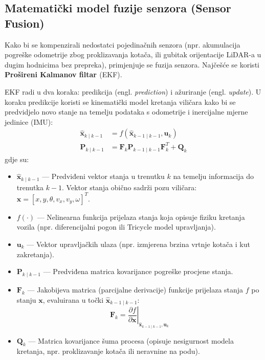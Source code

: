 \subsection{Matematički model fuzije senzora (Sensor Fusion)}
Kako bi se kompenzirali nedostatci pojedinačnih senzora (npr. akumulacija pogreške odometrije zbog proklizavanja kotača, ili gubitak orijentacije LiDAR-a u dugim hodnicima bez prepreka), primjenjuje se fuzija senzora. Najčešće se koristi \textbf{Prošireni Kalmanov filtar \cite{sensorfusion}} (EKF).

EKF radi u dva koraka: predikcija (engl. \textit{prediction}) i ažuriranje (engl. \textit{update}). U koraku predikcije koristi se kinematički model kretanja viličara kako bi se predvidjelo novo stanje na temelju podataka s odometrije i inercijalne mjerne jedinice (IMU):
\begin{align}
    \mathbf{\hat{x}}_{k \mid k-1} &= f(\mathbf{\hat{x}}_{k-1 \mid k-1}, \mathbf{u}_k) \\
    \mathbf{P}_{k \mid k-1} &= \mathbf{F}_k \mathbf{P}_{k-1 \mid k-1} \mathbf{F}_k^T + \mathbf{Q}_k
\end{align}
gdje su:
\begin{itemize}
    \item $\mathbf{\hat{x}}_{k \mid k-1}$ — Predviđeni vektor stanja u trenutku $k$ na temelju informacija do trenutka $k-1$. Vektor stanja obično sadrži pozu viličara: $\mathbf{x} = [x, y, \theta, v_x, v_y, \omega]^T$.
    \item $f(\cdot)$ — Nelinearna funkcija prijelaza stanja koja opisuje fiziku kretanja vozila (npr. diferencijalni pogon ili Tricycle model upravljanja).
    \item $\mathbf{u}_k$ — Vektor upravljačkih ulaza (npr. izmjerena brzina vrtnje kotača i kut zakretanja).
    \item $\mathbf{P}_{k \mid k-1}$ — Predviđena matrica kovarijance pogreške procjene stanja.
    \item $\mathbf{F}_k$ — Jakobijeva matrica (parcijalne derivacije) funkcije prijelaza stanja $f$ po stanju $\mathbf{x}$, evaluirana u točki $\mathbf{\hat{x}}_{k-1 \mid k-1}$:
    \begin{equation}
        \mathbf{F}_k = \left. \frac{\partial f}{\partial \mathbf{x}} \right|_{\mathbf{\hat{x}}_{k-1 \mid k-1}, \mathbf{u}_k}
    \end{equation}
    \item $\mathbf{Q}_k$ — Matrica kovarijance šuma procesa (opisuje nesigurnost modela kretanja, npr. proklizavanje kotača ili neravnine na podu).
\end{itemize}

